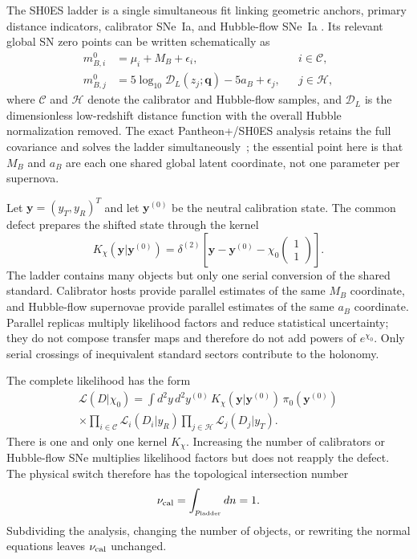 \documentclass[aps,prd,twocolumn,10pt,superscriptaddress,nofootinbib]{revtex4-2}
\begin{document}
The SH0ES ladder is a single simultaneous fit linking geometric anchors,
primary distance indicators, calibrator SNe~Ia, and Hubble-flow SNe~Ia
\cite{Riess2022}.  Its relevant global SN zero points can be written
schematically as
\begin{align}
 m_{B,i}^{0}&=\mu_i+M_B+\epsilon_i,
 &&i\in\mathcal C,
 \label{eq:portal_calibrator_block}\\
 m_{B,j}^{0}&=5\log_{10}\mathcal D_L(z_j;\mathbf q)-5a_B+\epsilon_j,
 &&j\in\mathcal H,
 \label{eq:portal_hubble_block}
\end{align}
where $\mathcal C$ and $\mathcal H$ denote the calibrator and Hubble-flow
samples, and $\mathcal D_L$ is the dimensionless low-redshift distance
function with the overall Hubble normalization removed.  The exact
Pantheon+/SH0ES analysis retains the full covariance and solves the ladder
simultaneously~\cite{Riess2022,Brout2022}; the essential point here is that
$M_B$ and $a_B$ are each one shared global latent coordinate, not one
parameter per supernova.

Let $\mathbf y=(y_T,y_R)^T$ and let $\mathbf y^{(0)}$ be the neutral
calibration state.  The common defect prepares the shifted state through the
kernel
\begin{equation}
 K_{\chi}(\mathbf y|\mathbf y^{(0)})
 =\delta^{(2)}\!\left[
 \mathbf y-\mathbf y^{(0)}-\chi_0
 \begin{pmatrix}1\\1\end{pmatrix}
 \right].
 \label{eq:portal_gate_kernel}
\end{equation}
The ladder contains many objects but only one serial conversion of the
shared standard.  Calibrator hosts provide parallel estimates of the same
$M_B$ coordinate, and Hubble-flow supernovae provide parallel estimates of
the same $a_B$ coordinate.  Parallel replicas multiply likelihood factors
and reduce statistical uncertainty; they do not compose transfer maps and
therefore do not add powers of $e^{\chi_0}$.  Only serial crossings of
inequivalent standard sectors contribute to the holonomy.

The complete likelihood has the form
\begin{multline}
 \mathcal L(D|\chi_0)=
 \int d^2y\,d^2y^{(0)}\,
 K_\chi(\mathbf y|\mathbf y^{(0)})\,\pi_0(\mathbf y^{(0)})\\
 \times
 \prod_{i\in\mathcal C}\mathcal L_i(D_i|y_R)
 \prod_{j\in\mathcal H}\mathcal L_j(D_j|y_T).
 \label{eq:portal_hierarchical_likelihood}
\end{multline}
There is one and only one kernel $K_\chi$.  Increasing the number of
calibrators or Hubble-flow SNe multiplies likelihood factors but does not
reapply the defect.  The physical switch therefore has the topological
intersection number
\begin{equation}
 \nu_{\rm cal}=\int_{p_{\rm ladder}}dn=1.
 \label{eq:portal_single_intersection}
\end{equation}
Subdividing the analysis, changing the number of objects, or rewriting the
normal equations leaves $\nu_{\rm cal}$ unchanged.
\end{document}
